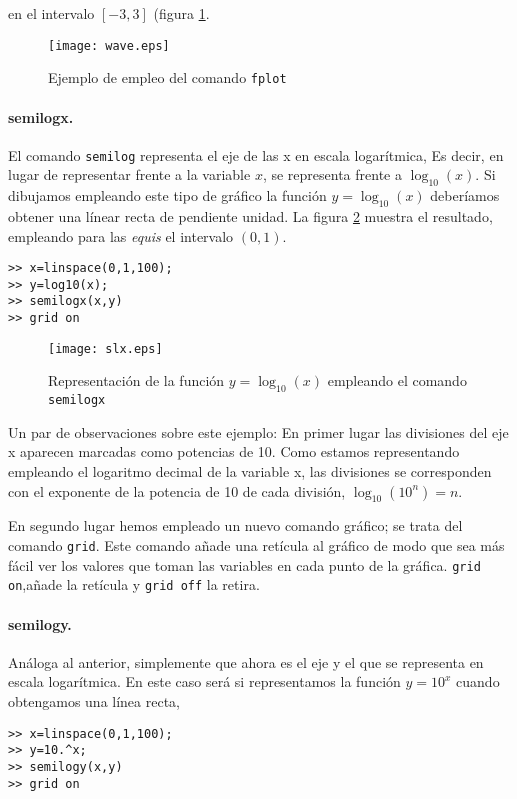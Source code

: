 en el intervalo $[-3,3]$ (figura \ref{fig:wave}.

\begin{figure}[h]
\centering
\texttt{[image: wave.eps]}
\caption{Ejemplo de empleo del comando \texttt{fplot}}
\label{fig:wave}
\end{figure} 
 
\paragraph{semilogx.} El comando \texttt{semilog} representa el eje de las x en escala logarítmica, Es decir, en lugar de representar frente a la variable $x$, se representa frente a $\log_{10}(x)$. Si dibujamos empleando este tipo de gráfico la función $y=\log_{10}(x)$ deberíamos obtener una línear recta de pendiente unidad. La figura \ref{fig:slx} muestra el resultado, empleando para las \emph{equis} el intervalo $(0,1)$.
\begin{verbatim}
>> x=linspace(0,1,100);
>> y=log10(x);
>> semilogx(x,y)
>> grid on
\end{verbatim}

\begin{figure}[h]
\centering
\texttt{[image: slx.eps]}
\caption{Representación de la función $y=\log_{10}(x)$ empleando el comando \texttt{semilogx}}
\label{fig:slx}
\end{figure} 

Un par de observaciones sobre este ejemplo: En primer lugar las divisiones del eje x aparecen marcadas como potencias de 10. Como estamos representando empleando el logaritmo decimal de la variable x, las divisiones se corresponden con el exponente de la potencia de 10 de cada división, $\log_{10}(10^n)=n$.

En segundo lugar hemos empleado un nuevo comando gráfico; se trata del comando \texttt{grid}. Este comando añade una retícula al gráfico de modo que sea más fácil ver los valores que toman las variables en cada punto de la gráfica. \texttt{grid on},añade la retícula y \texttt{grid off} la retira.

\paragraph{semilogy.} Análoga al anterior, simplemente que ahora es el eje y el que se representa en escala logarítmica. En este caso será si representamos la función $y=10^x$ cuando obtengamos una línea recta,

\begin{verbatim}
>> x=linspace(0,1,100);
>> y=10.^x;
>> semilogy(x,y)
>> grid on
\end{verbatim}

